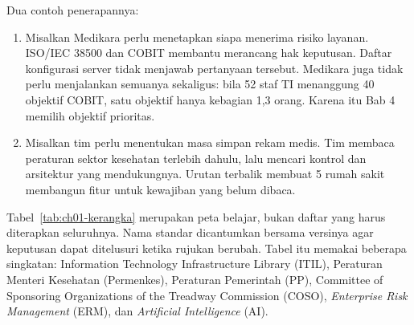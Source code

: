 Dua contoh penerapannya:
\begin{enumerate}
  \item Misalkan Medikara perlu menetapkan siapa menerima risiko layanan. ISO/IEC 38500
  dan COBIT membantu merancang hak keputusan. Daftar konfigurasi server tidak menjawab
  pertanyaan tersebut. Medikara juga tidak perlu menjalankan semuanya sekaligus: bila 52
  staf TI menanggung 40 objektif COBIT, satu objektif hanya kebagian 1,3 orang. Karena itu
  Bab 4 memilih objektif prioritas.
  \item Misalkan tim perlu menentukan masa simpan rekam medis. Tim membaca peraturan
  sektor kesehatan terlebih dahulu, lalu mencari kontrol dan arsitektur yang
  mendukungnya. Urutan terbalik membuat 5 rumah sakit membangun fitur untuk kewajiban yang
  belum dibaca.
\end{enumerate}

Tabel~\ref{tab:ch01-kerangka} merupakan peta belajar, bukan daftar yang harus diterapkan
seluruhnya. Nama standar dicantumkan bersama versinya agar keputusan dapat ditelusuri ketika
rujukan berubah. Tabel itu memakai beberapa singkatan: Information Technology Infrastructure
Library (ITIL), Peraturan Menteri Kesehatan (Permenkes), Peraturan Pemerintah (PP), Committee
of Sponsoring Organizations of the Treadway Commission (COSO), \textit{Enterprise Risk
Management} (ERM), dan \textit{Artificial Intelligence} (AI).

